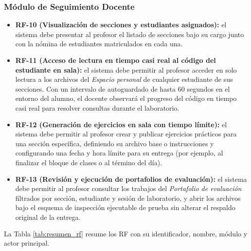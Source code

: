 \subsubsection{Módulo de Seguimiento Docente}
\begin{itemize}
    \item \textbf{RF-10 (Visualización de secciones y estudiantes asignados):} el sistema debe presentar al profesor el listado de secciones bajo su cargo junto con la nómina de estudiantes matriculados en cada una.
    \item \textbf{RF-11 (Acceso de lectura en tiempo casi real al código del estudiante en sala):} el sistema debe permitir al profesor acceder en solo lectura a los archivos del \textit{Espacio personal} de cualquier estudiante de sus secciones. Con un intervalo de autoguardado de hasta 60 segundos en el entorno del alumno, el docente observará el progreso del código en tiempo casi real para resolver consultas durante el laboratorio.
    \item \textbf{RF-12 (Generación de ejercicios en sala con tiempo límite):} el sistema debe permitir al profesor crear y publicar ejercicios prácticos para una sección específica, definiendo su archivo base o instrucciones y configurando una fecha y hora límite para su entrega (por ejemplo, al finalizar el bloque de clases o al término del día).
    \item \textbf{RF-13 (Revisión y ejecución de portafolios de evaluación):} el sistema debe permitir al profesor consultar los trabajos del \textit{Portafolio de evaluación} filtrados por sección, estudiante y sesión de laboratorio, y abrir los archivos bajo el esquema de inspección ejecutable de prueba sin alterar el respaldo original de la entrega.
\end{itemize}

La Tabla \ref{tab:resumen_rf} resume los RF con su identificador, nombre, módulo y actor principal.


